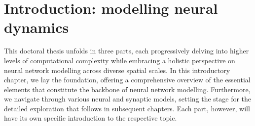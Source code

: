 \documentclass[../main.tex]{subfiles}
\begin{document}
\chapter{Introduction: modelling neural dynamics}
This doctoral thesis unfolds in three parts, each progressively delving into higher levels of computational complexity while embracing a holistic perspective on neural network modelling across diverse spatial scales.
In this introductory chapter, we lay the foundation, offering a comprehensive overview of the essential elements that constitute the backbone of neural network modelling.
Furthermore, we navigate through various neural and synaptic models, setting the stage for the detailed exploration that follows in subsequent chapters.
Each part, however, will have its own specific introduction to the respective topic.





\end{document}
